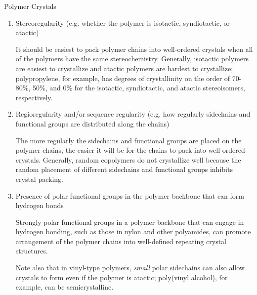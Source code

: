 \begin{activity}{Polymer Crystals}
\begin{ctqs}
		\begin{enumerate}
		
			\item Stereoregularity (e.g. whether the polymer is isotactic, syndiotactic, or atactic)
	
		\begin{solution}[0.75in]{}
			It should be easiest to pack polymer chains into well-ordered crystals when all of the polymers have the same stereochemistry.  Generally, isotactic polymers are easiest to crystallize and atactic polymers are hardest to crystallize; polypropylene, for example, has degrees of crystallinity on the order of 70-80\%, 50\%, and 0\% for the isotactic, syndiotactic, and atactic stereoisomers, respectively.
		\end{solution}
			
			\item Regioregularity and/or sequence regularity (e.g. how regularly sidechains and functional groups are distributed along the chains)
	
		\begin{solution}[0.75in]{}
			The more regularly the sidechains and functional groups are placed on the polymer chains, the easier it will be for the chains to pack into well-ordered crystals.
			Generally, random copolymers do not crystallize well because the random placement of different sidechains and functional groups inhibits crystal packing.
		\end{solution}
			
			\item Presence of polar functional groups in the polymer backbone that can form hydrogen bonds
	
		\begin{solution}[0.75in]{}
			Strongly polar functional groups in a polymer backbone that can engage in hydrogen bonding, such as those in nylon and other polyamides, can promote arrangement of the polymer chains into well-defined repeating crystal structures.
			
			Note also that in vinyl-type polymers, \textit{small} polar sidechains can also allow crystals to form even if the polymer is atactic; poly(vinyl alcohol), for example, can be semicrystalline.
		\end{solution}
			
		\end{enumerate}
	
\end{ctqs}

\begin{model}
\label{\labelbase:mdl:thermodynamics}
	

\end{model}
\end{activity}
